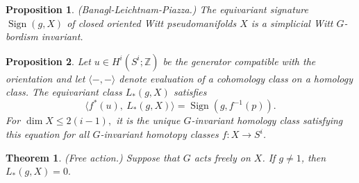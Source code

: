 \documentclass[10pt,a4paper]{amsart}
\newtheorem{prop}{Proposition}
\newtheorem{thm}{Theorem}
\newcommand {\Sign}    {{\ensuremath{\operatorname{Sign}}}}
\newcommand {\intg}  {\ensuremath{\mathbb{Z}}}
\begin{document}
\begin{prop} \label{prop.wittgbordisminvariance}
(Banagl-Leichtnam-Piazza.) The equivariant signature $\Sign (g,X)$
of closed oriented Witt pseudomanifolds $X$ is a simplicial Witt $G$-bordism invariant.
\end{prop}

\begin{prop} \label{prop.evaloflgxissigngpreim}
Let $u\in H^i (S^i;\intg)$ be the generator compatible with the orientation
and let $\langle -,- \rangle$ denote evaluation of a cohomology class on
a homology class.
The equivariant class $L_* (g,X)$ satisfies
\begin{equation} \label{equ.fulgxissigngfinvp}
\langle f^* (u),~ L_* (g,X) \rangle = \Sign (g,f^{-1} (p)). 
\end{equation}
For $\dim X \leq 2(i-1),$
it is the unique $G$-invariant homology class satisfying this equation
for all $G$-invariant homotopy classes $f: X \to S^i$.
\end{prop}

\begin{thm} \label{thm.freeaction}
(Free action.)
Suppose that $G$ acts freely on $X$.
If $g\not= 1$, then $L_* (g,X) =0.$
\end{thm}
\end{document}

